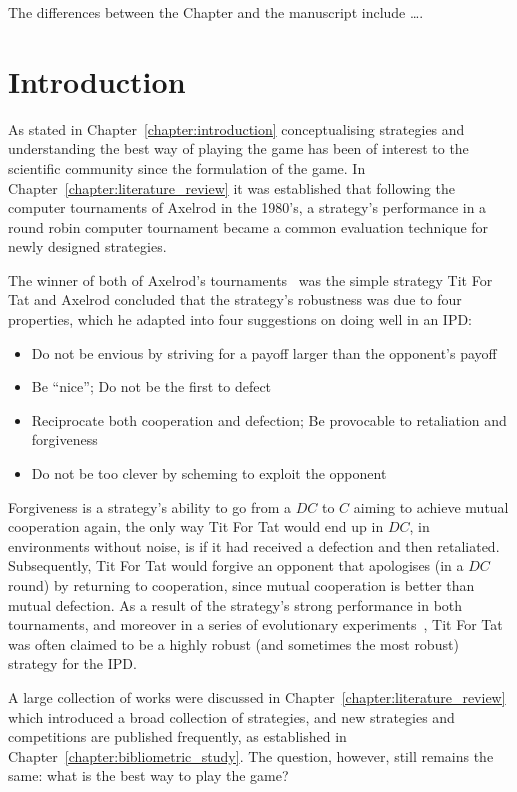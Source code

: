 \hrulefill

The differences between the Chapter and the manuscript include \dots.

\section{Introduction}

As stated in Chapter~\ref{chapter:introduction} conceptualising strategies and
understanding the best way of playing the game has been of interest to the
scientific community since the formulation of the game. In
Chapter~\ref{chapter:literature_review} it was established that following the
computer tournaments of Axelrod in the 1980's, a strategy's performance in a
round robin computer tournament became a common evaluation technique for newly
designed strategies.

The winner of both of Axelrod's tournaments~\cite{Axelrod1980a, Axelrod1980b}
was the simple strategy Tit For Tat and Axelrod concluded that the strategy's
robustness was due to four properties, which he adapted into four suggestions on
doing well in an IPD:

\begin{itemize}
    \item Do not be envious by striving for a payoff larger than the opponent's payoff
    \item Be ``nice''; Do not be the first to defect
    \item Reciprocate both cooperation and defection; Be provocable to retaliation and forgiveness
    \item Do not be too clever by scheming to exploit the opponent
\end{itemize}

Forgiveness is a strategy's ability to go from a \(DC\) to \(C\) aiming to achieve
mutual cooperation again, the only way Tit For Tat would end up in \(DC\), in
environments without noise, is if it had received a defection and then retaliated.
Subsequently, Tit For Tat would forgive an opponent that apologises (in a \(DC\) round)
by returning to cooperation, since mutual cooperation is better than mutual defection.
As a result of the strategy's strong performance in both tournaments, and moreover in a
series of evolutionary experiments~\cite{Axelrod1981}, Tit For Tat was often
claimed to be a highly robust (and sometimes the most robust) strategy for the IPD.

A large collection of works were discussed in
Chapter~\ref{chapter:literature_review} which introduced a broad collection of
strategies, and new strategies and competitions are published frequently,
as established in Chapter~\ref{chapter:bibliometric_study}. The question,
however, still remains the same: what is the best way to play the game?

